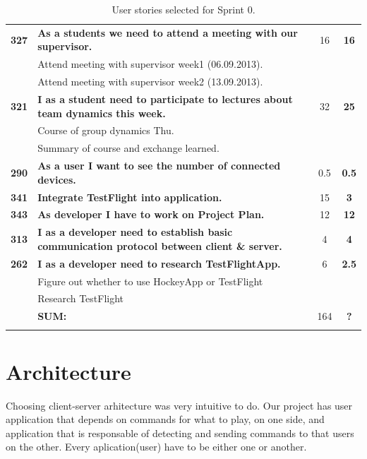 \begin{longtable}{cp{8cm}cc}
\textbf{327} 	& {\bf As a students we need to attend a meeting with our supervisor. } 	& 		16	& \textbf{16} \\
				& Attend meeting with supervisor week1 (06.09.2013).	&  &  \\
				& Attend meeting with supervisor week2 (13.09.2013).	&  &  \\

\textbf{321} 	& {\bf I as a student need to participate to lectures about team dynamics this week. } 	& 		32	& \textbf{25} \\
				& Course of group dynamics Thu.	&  &  \\
				& Summary of course and exchange learned.	&  &  \\
				
\textbf{290} 	& {\bf As a user I want to see the number of connected devices. } 	& 		0.5	& \textbf{0.5} \\

\textbf{341} 	& {\bf Integrate TestFlight into application. } 	& 		15	& \textbf{3} \\

\textbf{343} 	& {\bf As developer I have to work on Project Plan.} 	& 		12	& \textbf{12} \\

\textbf{313} 	& {\bf I as a developer need to establish basic communication protocol between client \& server.} 	& 		4	& \textbf{4} \\

\textbf{262} 	& {\bf I as a developer need to research TestFlightApp. } 	& 		6	& \textbf{2.5} \\
				& Figure out whether to use HockeyApp or TestFlight&  &  \\
				& Research TestFlight	&  &  \\
				
\hline
				& \textbf{SUM:}		&		164	& \textbf{?}
 \\																			
\bottomrule[1mm]
\caption{User stories selected for Sprint 0. }
\label{tab:sprint0stories}
\end{longtable}


\section{Architecture}

Choosing client-server arhitecture was very intuitive to do.
Our project has user application that depends on commands for what to play, on one side, and application that is responsable of detecting and sending commands to that users on the other.
Every aplication(user) have to be either one or another. 

